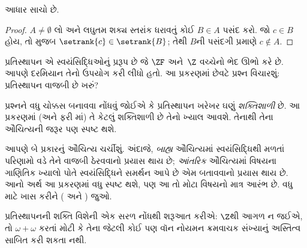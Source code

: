 \begin{prop} આધાર સાચો છે.
\end{prop}

\begin{proof}
$A \neq \emptyset$ લો અને લઘુતમ શક્ય સ્તરાંક ધરાવતું
કોઈ $B \in A$ પસંદ કરો. જો $c \in B$ હોય, તો
 મુજબ $\setrank{c} \in \setrank{B}$;
તેથી $B$ની પસંદગી પ્રમાણે $c \notin A$.
\end{proof}
\endgroup


\OLEndChapterHook
\endgroup

\begingroup
\makeatletter{}\makeatother

\label{guunit:OLP-0565}


\begingroup
\makeatletter{}\makeatother

\label{guunit:OLP-0566}


પ્રતિસ્થાપન એ સ્વયંસિદ્ધિઓનું પ્રરૂપ છે જે $\ZF$
અને~$\Z$ વચ્ચેનો ભેદ ઊભો કરે છે. આપણે
 દરમિયાન તેનો
ઉપયોગ કરી લીધો હતો. આ પ્રકરણમાં છેવટે પ્રશ્ન વિચારશું:
પ્રતિસ્થાપન વાજબી છે ખરું?

પ્રશ્નને વધુ ચોક્કસ બનાવવા નોંધવું જોઈએ કે પ્રતિસ્થાપન ખરેખર
ઘણું \emph{શક્તિશાળી} છે. આ પ્રકરણમાં (અને ફરી
માં) તે કેટલું શક્તિશાળી
છે તેનો ખ્યાલ આવશે. તેનાથી તેના ઔચિત્યની જરૂર પણ સ્પષ્ટ થશે.

આપણે બે પ્રકારનું ઔચિત્ય ચર્ચીશું. અંદાજે, \emph{બાહ્ય}
ઔચિત્યમાં સ્વયંસિદ્ધિથી મળતાં પરિણામો વડે તેને વાજબી
ઠેરવવાનો પ્રયાસ થાય છે; \emph{આંતરિક} ઔચિત્યમાં વિષયના
ગાણિતિક ખ્યાલો પોતે સ્વયંસિદ્ધિને સમર્થન આપે છે એમ બતાવવાનો
પ્રયાસ થાય છે. આનો અર્થ આ પ્રકરણમાં વધુ સ્પષ્ટ થશે, પણ આ તો
મોટા વિષયનો માત્ર આરંભ છે. વધુ માટે ખાસ કરીને
\citeauthor{Maddy1988a} (\citeyear{Maddy1988a} અને
\citeyear{Maddy1988b}) જુઓ.
\endgroup

\begingroup
\makeatletter{}\makeatother

\label{guunit:OLP-0567}


પ્રતિસ્થાપનની શક્તિ વિશેની એક સરળ નોંધથી શરૂઆત કરીએ:
$\Z$થી આગળ ન જઈએ, તો $\omega + \omega$ કરતાં મોટી કે
તેના જેટલી કોઈ પણ વૉન નોયમન ક્રમવાચક સંખ્યાનું અસ્તિત્વ
સાબિત કરી શકતા નથી.

